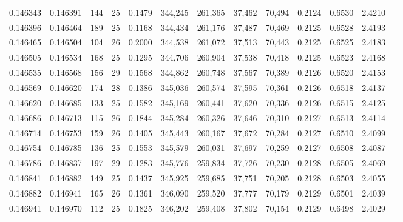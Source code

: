 \begin{tabular}{rrrrrrrrrrrrr}
0.146343 & 0.146391 & 144 &  25 &                                     0.1479 & 344,245 & 261,365 &  37,462 &  70,494 & 0.2124 & 0.6530 & 2.4210 \\
0.146396 & 0.146464 & 189 &  25 &                                     0.1168 & 344,434 & 261,176 &  37,487 &  70,469 & 0.2125 & 0.6528 & 2.4193 \\
0.146465 & 0.146504 & 104 &  26 &                                     0.2000 & 344,538 & 261,072 &  37,513 &  70,443 & 0.2125 & 0.6525 & 2.4183 \\
0.146505 & 0.146534 & 168 &  25 &                                     0.1295 & 344,706 & 260,904 &  37,538 &  70,418 & 0.2125 & 0.6523 & 2.4168 \\
0.146535 & 0.146568 & 156 &  29 &                                     0.1568 & 344,862 & 260,748 &  37,567 &  70,389 & 0.2126 & 0.6520 & 2.4153 \\
0.146569 & 0.146620 & 174 &  28 &                                     0.1386 & 345,036 & 260,574 &  37,595 &  70,361 & 0.2126 & 0.6518 & 2.4137 \\
0.146620 & 0.146685 & 133 &  25 &                                     0.1582 & 345,169 & 260,441 &  37,620 &  70,336 & 0.2126 & 0.6515 & 2.4125 \\
0.146686 & 0.146713 & 115 &  26 &                                     0.1844 & 345,284 & 260,326 &  37,646 &  70,310 & 0.2127 & 0.6513 & 2.4114 \\
0.146714 & 0.146753 & 159 &  26 &                                     0.1405 & 345,443 & 260,167 &  37,672 &  70,284 & 0.2127 & 0.6510 & 2.4099 \\
0.146754 & 0.146785 & 136 &  25 &                                     0.1553 & 345,579 & 260,031 &  37,697 &  70,259 & 0.2127 & 0.6508 & 2.4087 \\
0.146786 & 0.146837 & 197 &  29 &                                     0.1283 & 345,776 & 259,834 &  37,726 &  70,230 & 0.2128 & 0.6505 & 2.4069 \\
0.146841 & 0.146882 & 149 &  25 &                                     0.1437 & 345,925 & 259,685 &  37,751 &  70,205 & 0.2128 & 0.6503 & 2.4055 \\
0.146882 & 0.146941 & 165 &  26 &                                     0.1361 & 346,090 & 259,520 &  37,777 &  70,179 & 0.2129 & 0.6501 & 2.4039 \\
0.146941 & 0.146970 & 112 &  25 &                                     0.1825 & 346,202 & 259,408 &  37,802 &  70,154 & 0.2129 & 0.6498 & 2.4029 \\

\end{tabular}

